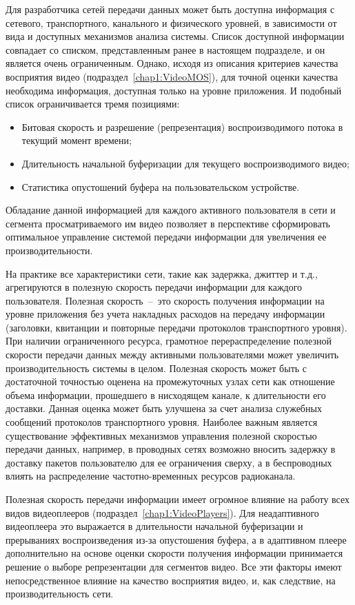 Для разработчика сетей передачи данных может быть доступна информация с сетевого, транспортного, канального и физического уровней, в зависимости от вида и доступных механизмов анализа системы. Список доступной информации совпадает со списком, представленным ранее в настоящем подразделе, и он является очень ограниченным. Однако, исходя из описания критериев качества восприятия видео (подраздел~\ref{chap1:VideoMOS}), для точной оценки качества необходима информация, доступная только на уровне приложения. И подобный список ограничивается тремя позициями:
\begin{itemize}
  \item Битовая скорость и разрешение (репрезентация) воспроизводимого потока в текущий момент времени;
  \item Длительность начальной буферизации для текущего воспроизводимого видео;
  \item Статистика опустошений буфера на пользовательском устройстве.
\end{itemize}
Обладание данной информацией для каждого активного пользователя в сети и сегмента просматриваемого им видео позволяет в перспективе сформировать оптимальное управление системой передачи информации для увеличения ее производительности.

На практике все характеристики сети, такие как задержка, джиттер и т.д., агрегируются в полезную скорость передачи информации для каждого пользователя. Полезная скорость~--~это скорость получения информации на уровне приложения без учета накладных расходов на передачу информации (заголовки, квитанции и повторные передачи протоколов транспортного уровня). При наличии ограниченного ресурса, грамотное перераспределение полезной скорости передачи данных между активными пользователями может увеличить производительность системы в целом. Полезная скорость может быть с достаточной точностью оценена на промежуточных узлах сети как отношение объема информации, прошедшего в нисходящем канале, к длительности его доставки. Данная оценка может быть улучшена за счет анализа служебных сообщений протоколов транспортного уровня. Наиболее важным является существование эффективных механизмов управления полезной скоростью передачи данных, например, в проводных сетях возможно вносить задержку в доставку пакетов пользователю для ее ограничения сверху, а в беспроводных влиять на распределение частотно-временных ресурсов радиоканала.

Полезная скорость передачи информации имеет огромное влияние на работу всех видов видеоплееров (подраздел~\ref{chap1:VideoPlayers}). Для неадаптивного видеоплеера это выражается в длительности начальной буферизации и прерываниях воспроизведения из-за опустошения буфера, а в адаптивном плеере дополнительно на основе оценки скорости получения информации принимается решение о выборе репрезентации для сегментов видео. Все эти факторы имеют непосредственное влияние на качество восприятия видео, и, как следствие, на производительность сети.

